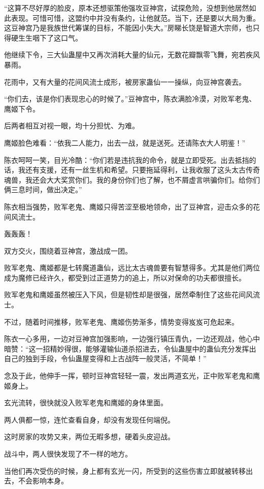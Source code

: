 \begin{this_body}
“这算不尽好厚的脸皮，原本还想驱策他强攻豆神宫，试探危险，没想到他居然如此表现。可惜可惜，这盟约中并没有条约，让他就范。当下，还是要以大局为重。这豆神宫乃是我族世代筹谋的目标，不能因小失大。”房睇长饶是智道大宗师，也只得硬生生咽下了这口气。

他继续下令，三大仙蛊屋中又再次消耗大量的仙元，无数花瓣飘零飞舞，宛若疾风暴雨。

花雨中，又有大量的花间风流士成形，被房家蛊仙一一操纵，向豆神宫袭去。

“你们去，该是你们表现忠心的时候了。”豆神宫中，陈衣满脸冷漠，对败军老鬼、鹰姬下令。

后两者相互对视一眼，均十分担忧、为难。

鹰姬脸色难看：“依我二人能力，出去一战，就是送死。还请陈衣大人明鉴！”

陈衣呵呵一笑，目光冷酷：“你们若是违抗我的命令，就是立即受死。出去抵挡的话，我还有支援，还有一丝生机和希望。只要拖延得利，让我收服了这头太古传奇魂兽，我还会大大奖赏你们。我的身份你们也了解，也不屑虚言哄骗你们。给你们俩三息时间，做出决定。”

陈衣相当强势，败军老鬼、鹰姬只得苦涩至极地领命，出了豆神宫，迎击众多的花间风流士。

轰轰轰！

双方交火，围绕着豆神宫，激战成一团。

败军老鬼、鹰姬都是七转魔道蛊仙，远比太古魂兽要有智慧得多。尤其是他们两位成为魔修已经许久，都受到过正道势力的追上，所以对保命的功夫都很擅长。

败军老鬼和鹰姬虽然被压入下风，但是韧性却是很强，居然牵制住了这些花间风流士。

不过，随着时间推移，败军老鬼、鹰姬伤势渐多，情势变得岌岌可危起来。

陈衣一心多用，一边对豆神宫加强影响，一边强行镇压青仇，一边还观战，他心中暗赞：“这一招精妙得很，能够灌输仙道杀招进去，令仙蛊屋中的蛊仙充分发挥出自己的独到手段，令仙蛊屋变得和上古战阵一般灵活，不简单！”

念及于此，他伸手一挥，顿时豆神宫轻轻一震，发出两道玄光，正中败军老鬼和鹰姬身上。

玄光流转，很快就没入败军老鬼和鹰姬的身体里面。

两人俱都一惊，连忙查看自身，却没有发现任何端倪。

这时房家的攻势又来，两位无暇多想，硬着头皮迎战。

战斗中，两人很快发现了不一样的地方。

当他们再次受伤的时候，身上都有玄光一闪，所受到的这些伤害立即就被转移出去，不会影响本身。


\end{this_body}
